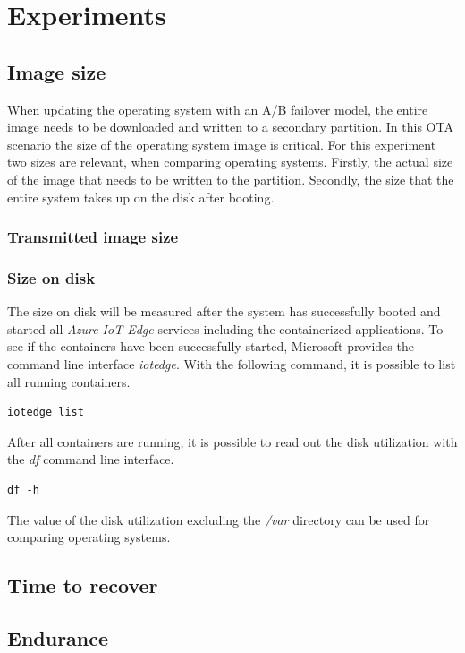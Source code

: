\section{Experiments}
\subsection{Image size}
When updating the operating system with an A/B failover model, the entire
image needs to be downloaded and written to a secondary partition. In this
\ac{OTA} scenario the size of the operating system image is critical.
For this experiment two sizes are relevant, when comparing operating systems.
Firstly, the actual size of the image that needs to be written to the partition.
Secondly, the size that the entire system takes up on the disk after booting.
\subsubsection{Transmitted image size}
\subsubsection{Size on disk}
The size on disk will be measured after the system has successfully booted
and started all \textit{Azure IoT Edge} services including the containerized
applications. To see if the containers have been successfully started,
Microsoft provides the command line interface \textit{iotedge}.
With the following command, it is possible to list all running containers.\\

\begin{lstlisting}[caption=Command to retrieve the status of all containers]
iotedge list
\end{lstlisting}
After all containers are running, it is possible to read out the disk utilization
with the \textit{df} command line interface. \cite{man-df}\\

\begin{lstlisting}[caption=Command to report file system space usage]
df -h
\end{lstlisting}
The value of the disk utilization excluding the \textit{/var} directory
can be used for comparing operating systems.



\subsection{Time to recover}
\subsection{Endurance}
